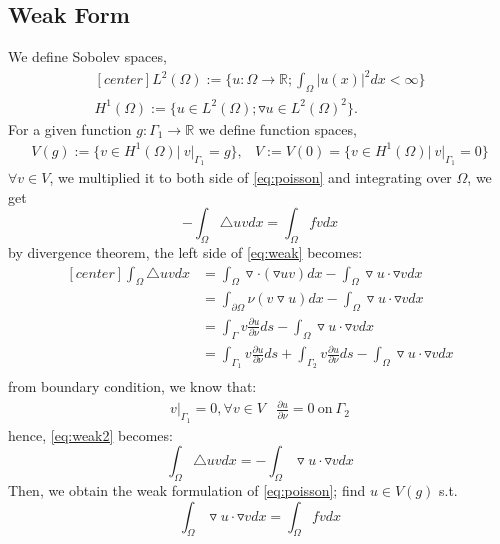 \documentclass[a4paper,12pt]{article}
\newcommand{\R}{\mathbb{R}}
\begin{document}
\subsection{Weak Form}
We define Sobolev spaces,
\begin{equation*}
\begin{aligned}[center]
L^2(\Omega) := \{u:\Omega \rightarrow \R; \int_\Omega|u(x)|^2 dx < \infty\}\\
H^1(\Omega) := \{u\in L^2(\Omega); \triangledown u \in L^2(\Omega)^2\}.
\end{aligned}
\end{equation*}
For a given function $g:\Gamma_1 \rightarrow \R$ we define function spaces,
\begin{eqnarray}\nonumber
V(g) := \{v \in H^1(\Omega)|\ v|_{\Gamma_1} = g\}, & V := V(0) = \{v \in H^1(\Omega)|\ v|_{\Gamma_1}=0\}
\end{eqnarray}
$\forall v \in V$, we multiplied it to both side of \eqref{eq:poisson} and integrating over $\Omega$, we get
\begin{equation}\label{eq:weak}
-\int_\Omega \triangle uv dx = \int_\Omega fv dx
\end{equation}
by divergence theorem, the left side of \eqref{eq:weak} becomes:
\begin{equation}\label{eq:weak2}
\begin{aligned}[center]
\int_\Omega \triangle uv dx &= \int_\Omega \triangledown \cdot (\triangledown uv) dx - \int_\Omega \triangledown u \cdot \triangledown v dx\\
&= \int_{\partial \Omega} \nu(v \triangledown u) dx - \int_\Omega \triangledown u \cdot \triangledown v dx\\
&= \int_{\Gamma} v \frac{\partial u}{\partial \nu} ds - \int_\Omega \triangledown u \cdot \triangledown v dx\\
&= \int_{\Gamma_1} v \frac{\partial u}{\partial \nu} ds + \int_{\Gamma_2} v \frac{\partial u}{\partial \nu} ds - \int_\Omega \triangledown u \cdot \triangledown v dx\\
\end{aligned}
\end{equation}
from boundary condition, we know that:
\begin{eqnarray}\nonumber
v|_{\Gamma_1} = 0, \forall v \in V & \frac{\partial u}{\partial \nu} = 0\ \text{on}\ \Gamma_2
\end{eqnarray}
hence, \eqref{eq:weak2} becomes:
\begin{equation*}
\int_\Omega \triangle uv dx = - \int_\Omega \triangledown u \cdot \triangledown v dx
\end{equation*}
Then, we obtain the weak formulation of \eqref{eq:poisson}; find $u\in V(g)$ s.t.
\begin{equation}\label{eq:weakform}
\int_\Omega \triangledown u \cdot \triangledown v dx = \int_\Omega fv dx
\end{equation}
\end{document}
